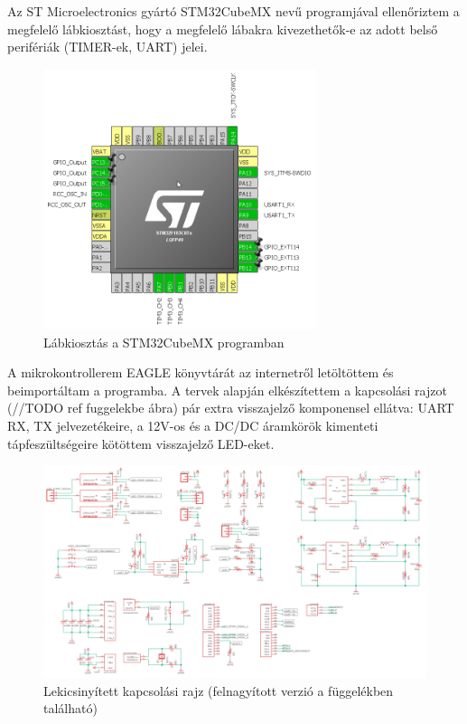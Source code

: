 \documentclass[../main.tex]{subfiles}
\begin{document}
            Az ST Microelectronics gyártó STM32CubeMX nevű programjával ellenőriztem a megfelelő lábkiosztást, hogy a megfelelő lábakra kivezethetők-e az adott belső perifériák (TIMER-ek, UART) jelei. 
            \begin{figure}[h!]
                \centering
                    \includegraphics[width=8cm]{resources/pcb_res/cubeMX_pinout.png}
                \caption{Lábkiosztás a STM32CubeMX programban}
                \label{fig:CubeMX_pinout}
            \end{figure}
            
            
            A mikrokontrollerem EAGLE könyvtárát az internetről letöltöttem és beimportáltam a programba. A tervek alapján elkészítettem a kapcsolási rajzot (//TODO ref fuggelekbe ábra) pár extra visszajelző komponensel ellátva: UART RX, TX jelvezetékeire, a 12V-os és a DC/DC áramkörök kimenteti tápfeszültségeire kötöttem visszajelző LED-eket. 
            
            \begin{figure}[h!]
                \centering
                    \includegraphics[width=12cm]{resources/pcb_res/schematic_v02.png}
                \caption{Lekicsinyített kapcsolási rajz (felnagyított verzió a függelékben található)}
                \label{fig:schamtic_v02}
            \end{figure}
            
\end{document}
